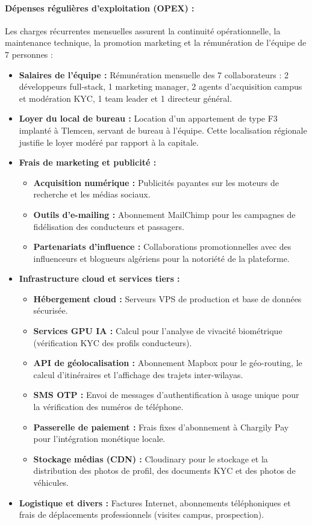 \paragraph{Dépenses régulières d'exploitation (OPEX) :}
Les charges récurrentes mensuelles assurent la continuité opérationnelle, la maintenance technique, la promotion marketing et la rémunération de l'équipe de 7 personnes :
\begin{itemize}[leftmargin=1.5em]
    \item \textbf{Salaires de l'équipe :} Rémunération mensuelle des 7 collaborateurs : 2 développeurs full-stack, 1 marketing manager, 2 agents d'acquisition campus et modération KYC, 1 team leader et 1 directeur général.
    \item \textbf{Loyer du local de bureau :} Location d'un appartement de type F3 implanté à Tlemcen, servant de bureau à l'équipe. Cette localisation régionale justifie le loyer modéré par rapport à la capitale.
    \item \textbf{Frais de marketing et publicité :}
    \begin{itemize}
        \item \textbf{Acquisition numérique :} Publicités payantes sur les moteurs de recherche et les médias sociaux.
        \item \textbf{Outils d'e-mailing :} Abonnement MailChimp pour les campagnes de fidélisation des conducteurs et passagers.
        \item \textbf{Partenariats d'influence :} Collaborations promotionnelles avec des influenceurs et blogueurs algériens pour la notoriété de la plateforme.
    \end{itemize}
    \item \textbf{Infrastructure cloud et services tiers :}
    \begin{itemize}
        \item \textbf{Hébergement cloud :} Serveurs VPS de production et base de données sécurisée.
        \item \textbf{Services GPU IA :} Calcul pour l'analyse de vivacité biométrique (vérification KYC des profils conducteurs).
        \item \textbf{API de géolocalisation :} Abonnement Mapbox pour le géo-routing, le calcul d'itinéraires et l'affichage des trajets inter-wilayas.
        \item \textbf{SMS OTP :} Envoi de messages d'authentification à usage unique pour la vérification des numéros de téléphone.
        \item \textbf{Passerelle de paiement :} Frais fixes d'abonnement à Chargily Pay pour l'intégration monétique locale.
        \item \textbf{Stockage médias (CDN) :} Cloudinary pour le stockage et la distribution des photos de profil, des documents KYC et des photos de véhicules.
    \end{itemize}
    \item \textbf{Logistique et divers :} Factures Internet, abonnements téléphoniques et frais de déplacements professionnels (visites campus, prospection).
\end{itemize}

